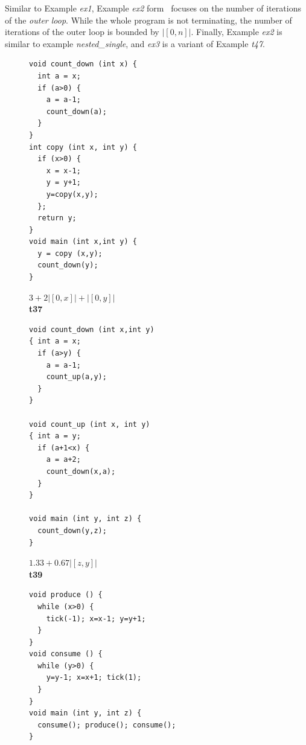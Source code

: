 \documentclass[nocopyrightspace,preprint,pldi]{sigplanconf-pldi15}
\begin{document}
{Similar to Example \emph{ex1}, Example \emph{ex2}
form~\cite{GulwaniZ10} focuses on the number of iterations of the
\emph{outer loop}.  While the whole program is not terminating, the
number of iterations of the outer loop is bounded by $|[0,n]|$.
Finally, Example \emph{ex2} is similar to example
\emph{nested\_single}, and \emph{ex3} is a variant of Example
\emph{t47}.

\begin{figure}
 \setlength{\progwidth}{.28\linewidth}
  \centering
%
%
  \begin{minipage}[b]{\progwidth}
    \begin{center}
   \begin{lstlisting}
void count_down (int x) {
  int a = x;
  if (a>0) {
    a = a-1;
    count_down(a);
  }
}
int copy (int x, int y) {
  if (x>0) {
    x = x-1;
    y = y+1;
    y=copy(x,y);
  };
  return y;
}
void main (int x,int y) {
  y = copy (x,y);
  count_down(y);
}
   \end{lstlisting}

$3 + 2|[0, x]| + |[0, y]|$
\\[.7\baselineskip]
      {\bf t37}
    \end{center}
  \end{minipage}
%
%
  \begin{minipage}[b]{\progwidth}
    \begin{center}
   \begin{lstlisting}
void count_down (int x,int y)
{ int a = x;
  if (a>y) {
    a = a-1;
    count_up(a,y);
  }
}

void count_up (int x, int y)
{ int a = y;
  if (a+1<x) {
    a = a+2;
    count_down(x,a);
  }
}

void main (int y, int z) {
  count_down(y,z);
}
   \end{lstlisting}

$1.33 + 0.67 |[z,y]|$
\\[.7\baselineskip]
      {\bf t39}
    \end{center}
  \end{minipage}
%
%
  \begin{minipage}[b]{\progwidth}
    \begin{center}
   \begin{lstlisting}
void produce () {
  while (x>0) {
    tick(-1); x=x-1; y=y+1;
  }
}
void consume () {
  while (y>0) {
    y=y-1; x=x+1; tick(1);
  }
}
void main (int y, int z) {
  consume(); produce(); consume();
}
   \end{lstlisting}


\end{center}
\end{minipage}
\end{figure}}
\end{document}
